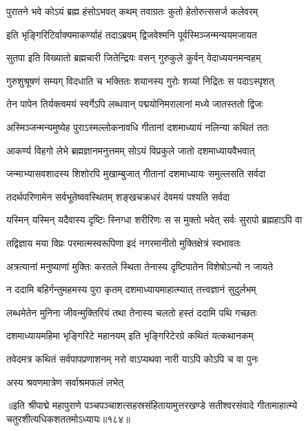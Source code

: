 
\twolineshloka
{पुरातने भवे कोऽयं ब्रह्म हंसोऽभवत् कथम्}
{तवाग्रतः कुतो हेतोरुत्ससर्ज कलेवरम्} %

\twolineshloka
{इति भृङ्गिरिटिर्वाक्यमाकर्ण्याहं तदाऽब्रवम्}
{द्विजवेश्मनि पूर्वस्मिञ्जन्मन्ययमजायत} %

\twolineshloka
{सुतपा इति विख्यातो ब्रह्मचारी जितेन्द्रियः}
{वसन् गुरुकुले कुर्वन् वेदाध्ययनमन्वहम्} %

\twolineshloka
{गुरुशुश्रूषणं सम्यग् विदधाति च भक्तितः}
{शयानस्य गुरोः शय्यां निद्रितः स पदाऽस्पृशत्} %

\twolineshloka
{तेन पापेन तिर्यक्त्वमयं स्वर्गेऽपि लब्धवान्}
{पद्मयोनिमरालानां मध्ये जातस्ततो द्विजः} %

\twolineshloka
{अस्मिञ्जन्मन्यमुष्येह पुराऽस्मल्लोकनावधि}
{गीतानां दशमाध्यायं नलिन्या कथितं ततः} %

\twolineshloka
{आकर्ण्य विहगो लेभे ब्रह्मज्ञानमनुत्तमम्}
{सोऽयं विप्रकुले जातो दशमाध्यायवैभवात्} %

\twolineshloka
{जन्माभ्यासवशादस्य शिशोरपि मुखाम्बुजात्}
{गीतानां दशमाध्यायः समुल्लसति सर्वदा} %

\twolineshloka
{तदर्थपरिणामेन सर्वभूतेष्ववस्थितम्}
{शङ्खचक्रधरं देवमयं पश्यति सर्वदा} %

\twolineshloka
{यस्मिन् यस्मिन् यदैवास्य दृष्टिः स्निग्धा शरीरिणः}
{स स मुक्तो भवेत् सर्वः सुरापो ब्रह्महाऽपि वा} %

\twolineshloka
{तद्विज्ञाय मया विप्रः परमात्मस्वरूपिणा}
{इदं नगरमानीतो मुक्तिक्षेत्रं स्वभावतः} %

\twolineshloka
{अत्रत्यानां मनुष्याणां मुक्तिः करतले स्थिता}
{तेनास्य दृष्टिपातेन विशेषोऽन्यो न जायते} %

\twolineshloka
{न ददामि बहिर्गन्तुमहमस्य पुरा कृतम्}
{दशमाध्यायमाहात्म्यात् तत्त्वज्ञानं सुदुर्लभम्} %

\twolineshloka
{लब्धमेतेन मुनिना जीवन्मुक्तिरियं तथा}
{तेनास्य चलतो हस्तं ददामि पथि गच्छतः} %

\twolineshloka
{दशमाध्यायमहिमा भृङ्गिरिटे महानयम्}
{इति भृङ्गिरिटेरग्रे कथितं यत्कथानकम्} %

\twolineshloka
{तवेदमत्र कथितं सर्वपापप्रणाशनम्}
{नरो वाऽप्यथवा नारी याऽपि कोऽपि च वा पुनः} %

\onelineshloka
{अस्य श्रवणमात्रेण सर्वाश्रमफलं लभेत्} %

॥इति श्रीपाद्मे महापुराणे पञ्चपञ्चाशत्सहस्रसंहितायामुत्तरखण्डे सतीश्वरसंवादे गीतामाहात्म्ये चतुरशीत्यधिकशततमोऽध्यायः॥१८४॥

